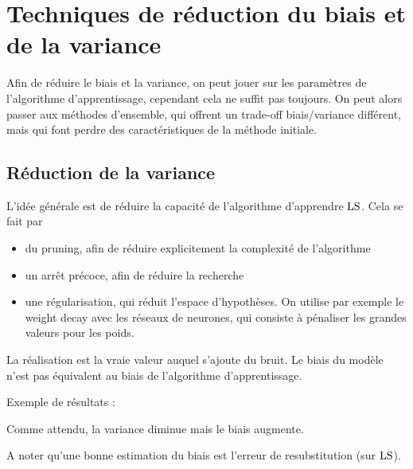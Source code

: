 	\section{Techniques de réduction du biais et de la variance}
	
	Afin de réduire le biais et la variance, on peut jouer sur les paramètres de l'algorithme d'apprentissage, cependant cela ne suffit pas toujours. On peut alors passer aux méthodes d'ensemble, qui offrent un trade-off biais/variance différent, mais qui font perdre des caractéristiques de la méthode initiale.
	
		\subsection{Réduction de la variance}
		
		L'idée générale est de réduire la capacité de l'algorithme d'apprendre $\text{LS}$. Cela se fait par
		
		\begin{itemize}
			\item du pruning, afin de réduire explicitement la complexité de l'algorithme
			\item un arrêt précoce, afin de réduire la recherche
			\item une régularisation, qui réduit l'espace d'hypothèses. On utilise par exemple le weight decay avec les réseaux de neurones, qui consiste à pénaliser les grandes valeurs pour les poids.
		\end{itemize}
		
		
		La réalisation est la vraie valeur auquel s'ajoute du bruit. Le biais du modèle n'est pas équivalent au biais de l'algorithme d'apprentissage.
				
		Exemple de résultats :
		
		
		Comme attendu, la variance diminue mais le biais augmente.
		
		A noter qu'une bonne estimation du biais est l'erreur de resubstitution (sur $\text{LS}$).